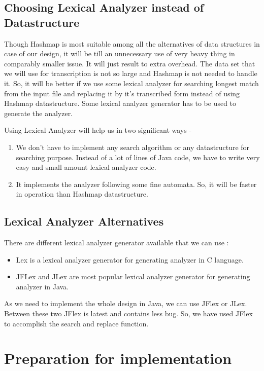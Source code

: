 \documentclass[12pt,oneside,openany,a4paper]{book}
\begin{document}
\section{Choosing Lexical Analyzer instead of Datastructure}
Though Hashmap is most suitable among all the alternatives of data structures in case of our design, it will be till an unnecessary use of very heavy thing in comparably smaller issue. It will just result to extra overhead. The data set that we will use for transcription is not so large and Hashmap is not needed to handle it. So, it will be better if we use some lexical analyzer for searching longest match from the input file and replacing it by it's transcribed form instead of using Hashmap datastructure. Some lexical analyzer generator has to be used to generate the analyzer.
\par \vspace{0.3cm}
Using Lexical Analyzer will help us in two significant ways - 
\begin{enumerate}
\item{We don't have to implement any search algorithm or any datastructure for searching purpose. Instead of a lot of lines of Java code, we have to write very easy and small amount lexical analyzer code.}
\item{It implements the analyzer following some fine automata. So, it will be faster in operation than Hashmap datastructure.}
\end{enumerate}

\section{Lexical Analyzer Alternatives}
There are different lexical analyzer generator available that we can use :
\begin{itemize}
\item {Lex is a lexical analyzer generator for generating analyzer in C language.}
\item {JFLex and JLex are most popular lexical analyzer generator for generating analyzer in Java.}
\end{itemize}
As we need to implement the whole design in Java, we can use JFlex or JLex. Between these two JFlex is latest and contains less bug. So, we have used JFlex to accomplish the search and replace function.



\chapter{Preparation for implementation}
\label{implementationpreparation}
\end{document}
